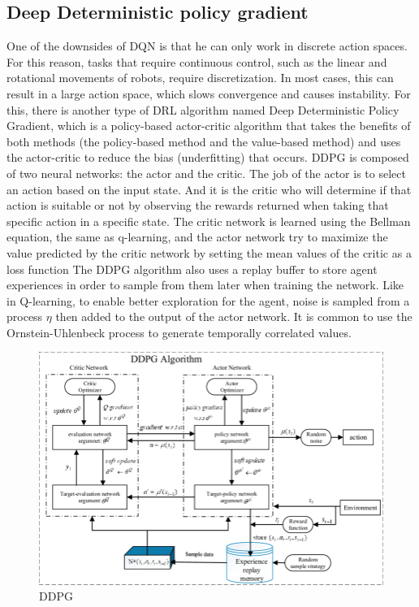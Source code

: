 \documentclass[12pt]{extarticle}
\begin{document}
\pagebreak

\subsection{Deep Deterministic policy gradient }
One of the downsides of DQN is that  he can  only work  in discrete action spaces. For this reason, tasks that require continuous control, such as the linear and rotational movements of robots, require discretization. In most cases, this can result in a large action space, which slows convergence and causes instability.
For this, there is another type of DRL algorithm named Deep Deterministic Policy Gradient, which is a policy-based actor-critic algorithm that takes the benefits of both methods (the policy-based method and the value-based method) and uses the actor-critic to reduce the bias (underfitting) that occurs.
DDPG is composed of two neural networks: the actor and the critic. The job of the actor is to select an action based on the input state. And it is the critic who will determine if that action is suitable or not by observing the rewards returned when taking that specific action in a specific state.
The critic network is learned using the Bellman equation, the same as q-learning, and the actor network try to maximize the value predicted by the critic network by setting the mean values of the critic as a loss function
The DDPG algorithm also uses a replay buffer to store agent experiences in order to sample from them later when training the network.
Like in Q-learning, to enable better exploration for the agent, noise is sampled from a process $\eta$ then added to the output of the actor network. It is common to use the Ornstein-Uhlenbeck process to generate temporally correlated values. \cite{lillicrap2015continuous}


 \begin{figure}[h] 
\centering
\includegraphics[scale=0.45]{ddpg}
\caption[ddpg]{DDPG }
\end{figure}
\end{document}
